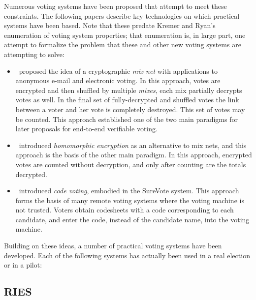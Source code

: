 Numerous voting systems have been proposed that attempt to meet these
constraints.  The following papers describe key technologies on which
practical systems have been based.  Note that these predate Kremer and
Ryan's enumeration of voting system properties; that enumeration is, in
large part, one attempt to formalize the problem that these and other new
voting systems are attempting to solve:

\begin{itemize}
  \item \cite{chaum1981}~proposed the idea of a cryptographic \emph{mix net}
    with applications to anonymous e-mail and electronic voting. In this
    approach, votes are encrypted and then shuffled by multiple
    \emph{mixes}, each mix partially decrypts votes as well. In the final
    set of fully-decrypted and shuffled votes the link between a voter and
    her vote is completely destroyed. This set of votes may be counted. This
    approach established one of the two main paradigms for later proposals
    for end-to-end verifiable voting.
  \item \cite{cohen1985}~introduced \emph{homomorphic encryption} as an
    alternative to mix nets, and this approach is the basis of the other
    main paradigm.  In this approach, encrypted votes are counted without
    decryption, and only after counting are the totals decrypted.
  \item \cite{chaum2001}~introduced \emph{code voting}, embodied in the
    SureVote system. This approach forms the basis of many remote voting
    systems where the voting machine is not trusted. Voters obtain
    codesheets with a code corresponding to each candidate, and enter the
    code, instead of the candidate name, into the voting machine.
\end{itemize}

Building on these ideas, a number of practical voting systems have been
developed.  Each of the following systems has actually been used in a real
election or in a pilot:

\subsection{RIES~\cite{hubbers2004}}

